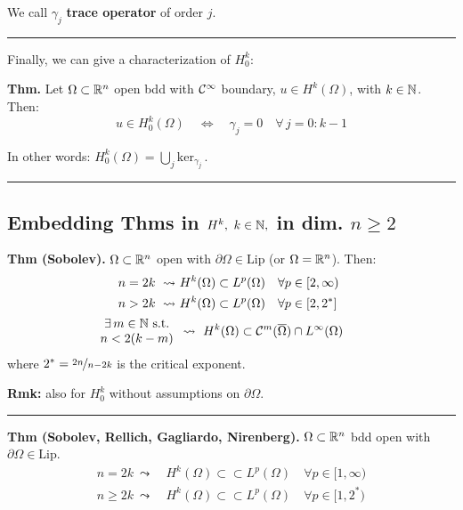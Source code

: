 We call $\gamma_j$ \textbf{trace operator} of order $j$.

\rule{0.31\textwidth}{0.2pt}
\smallskip

Finally, we can give a characterization of $H^k_0$:

\smallskip

\textbf{Thm.} Let $\Omega\subset\mathbb{R}^n$ open bdd with $\mathcal{C}^\infty$ boundary, $u\in H^k(\Omega)$, with $k\in\mathbb{N}$. Then:
\begin{equation*}
u\in H^k_0(\Omega) \quad\Longleftrightarrow\quad \gamma_j=0\quad\forall\,j=0:k-1
\end{equation*}

In other words: $H^k_0(\Omega)=\bigcup_j\text{ker}_{\gamma_j}\,.$

\rule{0.31\textwidth}{0.2pt}


\subsection{\color{red}Embedding Thms in \texorpdfstring{$H^k,\ k\in\mathbb{N},$}{C} in dim. \texorpdfstring{$n\geq 2$}{C}}


\textbf{Thm (Sobolev).} $\Omega\subset \mathbb{R}^n$ open with $\partial\Omega\in\text{Lip}$ (or $\Omega=\mathbb{R}^n$). Then:
\begin{align*}
n=2k\ \leadsto\ &H^k(\Omega)\subset L^p(\Omega)\quad \forall p\in [2,\infty) \\
n>2k\ \leadsto\ &H^k(\Omega)\subset L^p(\Omega)\quad \forall p\in [2,2^*] \\
\begin{array}{c}
\exists\, m\in\mathbb{N}\text{ s.t.}\\
n<2(k-m)   
\end{array}& 
\leadsto\ H^k(\Omega)\subset \mathcal{C}^m(\overline{\Omega})\cap L^\infty(\Omega)\qquad
\end{align*}
where $2^*=\nicefrac{2n}{n-2k}$ is the critical exponent.

\smallskip

\textbf{Rmk:} also for $H^k_0$ without assumptions on $\partial\Omega$.

\rule{0.31\textwidth}{0.2pt}
\smallskip

\textbf{Thm (Sobolev, Rellich, Gagliardo, Nirenberg).} $\Omega\subset \mathbb{R}^n$ bdd open with $\partial\Omega\in\text{Lip}$.
\begin{align*}
n=2k\ \leadsto\ &H^k(\Omega)\subset\subset L^p(\Omega)\quad \forall p\in [1,\infty) \\
n\geq 2k\ \leadsto\ &H^k(\Omega)\subset\subset L^p(\Omega)\quad \forall p\in [1,2^*)
\end{align*}


